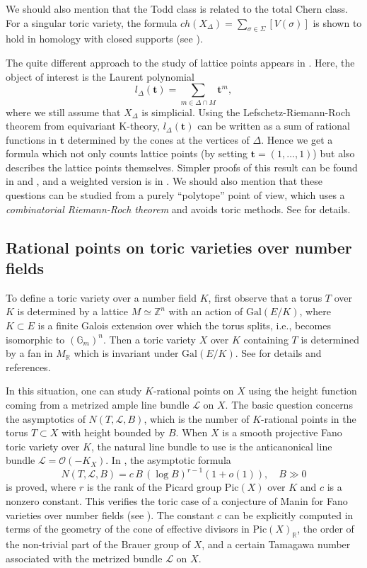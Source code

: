 \documentclass{amsart}
\theoremstyle{plain}
\theoremstyle{definition}
\begin{document}
	We should also mention that the Todd class is related to the
total Chern class.  For a singular toric variety, the formula
$ch(X_\Delta) = \sum_{\sigma\in\Sigma} [V(\sigma)]$ is shown to hold
in homology with closed supports (see \cite{BBF}).

	The quite different approach to the study of lattice points
appears in \cite{Bri1}.  Here, the object of interest is the Laurent
polynomial
\[
l_\Delta(\mathbf{t}) = \sum_{m\in \Delta\cap M}
\mathbf{t}^m, 
\]
where we still assume that $X_\Delta$ is simplicial.  Using the
Lefschetz-Riemann-Roch theorem from equivariant K-theory,
$l_\Delta(\mathbf{t})$ can be written as a sum of rational functions in
$\mathbf{t}$ determined by the cones at the vertices of $\Delta$.  Hence
we get a formula which not only counts lattice points (by setting
$\mathbf{t} = (1,\dots,1)$) but also describes the lattice points
themselves.  Simpler proofs of this result can be found in \cite{Ish}
and \cite{SI}, and a weighted version is in \cite{Bri2}.  We should
also mention that these questions can be studied from a purely
``polytope'' point of view, which uses a {\it combinatorial
Riemann-Roch theorem} and avoids toric methods.  See \cite{KK} for
details.

	\subsection{Rational points on toric varieties over number fields} To define a toric variety over a number field $K$,
first observe that a torus $T$ over $K$ is determined by a lattice $M
\simeq \mathbb{Z}^n$ with an action of $\mathrm{Gal}(E/K)$, where $K
\subset E$ is a finite Galois extension over which the torus splits,
i.e., becomes isomorphic to $(\mathbb{G}_m)^n$.  Then a toric variety
$X$ over $K$ containing $T$ is determined by a fan in $M_\mathbb{R}$
which is invariant under $\mathrm{Gal}(E/K)$.  See \cite{BT} for
details and references.

	In this situation, one can study $K$-rational points on $X$
using the height function coming from a metrized ample line bundle
$\mathcal{L}$ on $X$.  The basic question concerns the asymptotics of
$N(T,\mathcal{L},B)$, which is the number of $K$-rational points in the
torus $T \subset X$ with height bounded by $B$.  When $X$ is a smooth
projective Fano toric variety over $K$, the natural line bundle to use
is the anticanonical line bundle $\mathcal{L} = \mathcal{O}(-K_X)$.  In
\cite{BT}, the asymptotic formula
\[
N(T,\mathcal{L},B) = c\,B\,(\log B)^{r-1}(1 + o(1)),\quad B \gg 0 
\]
is proved, where $r$ is the rank of the Picard group $\mathrm{Pic}(X)$
over $K$ and $c$ is a nonzero constant.  This verifies the toric case
of a conjecture of Manin for Fano varieties over number fields (see
\cite{FMT}).  The constant $c$ can be explicitly computed in terms of
the geometry of the cone of effective divisors in
$\mathrm{Pic}(X)_\mathbb{R}$, the order of the non-trivial part of the
Brauer group of $X$, and a certain Tamagawa number associated with the
metrized bundle $\mathcal{L}$ on $X$.
\end{document}
